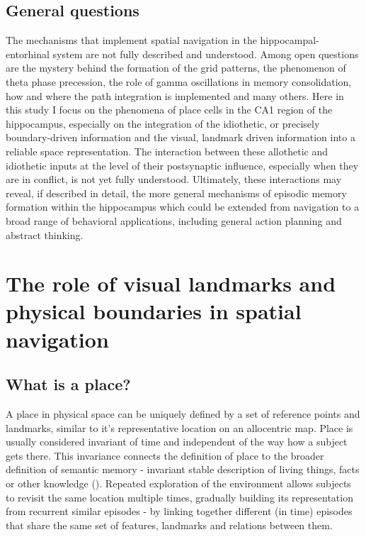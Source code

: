 \subsection{General questions}

The mechanisms that implement spatial navigation in the hippocampal-entorhinal system are not fully described and understood. Among open questions are the mystery behind the formation of the grid patterns, the phenomenon of theta phase precession, the role of gamma oscillations in memory consolidation, how and where the path integration is implemented and many others. Here in this study I focus on the phenomena of place cells in the CA1 region of the hippocampus, especially on the integration of the idiothetic, or precisely boundary-driven information and the visual, landmark driven information into a reliable space representation. The interaction between these allothetic and idiothetic inputs at the level of their postsynaptic influence, especially when they are in conflict, is not yet fully understood. Ultimately, these interactions may reveal, if described in detail, the more general mechanisms of episodic memory formation within the hippocampus which could be extended from navigation to a broad range of behavioral applications, including general action planning and abstract thinking.


\section{The role of visual landmarks and physical boundaries in spatial navigation}
\label{sec:role_of_landmarks}


\subsection{What is a place?}

A place in physical space can be uniquely defined by a set of reference points and landmarks, similar to it’s representative location on an allocentric map. Place is usually considered invariant of time and independent of the way how a subject gets there. This invariance connects the definition of place to the broader definition of semantic memory - invariant stable description of living things, facts or other knowledge (\cite{Buzsaki2013}). Repeated exploration of the environment allows subjects to revisit the same location multiple times, gradually building its representation from recurrent similar episodes - by linking together different (in time) episodes that share the same set of features, landmarks and relations between them.

